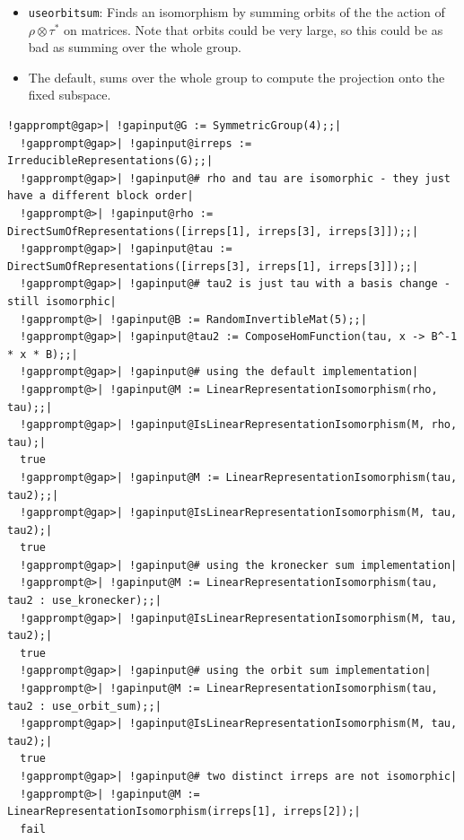 \documentclass[a4paper,11pt]{report}
\begin{document}
{{{ 
\begin{itemize}
\item  \texttt{use{\textunderscore}orbit{\textunderscore}sum}: Finds an isomorphism by summing orbits of the the action of $\rho \otimes \tau^*$ on matrices. Note that orbits could be very large, so this could be as bad as
summing over the whole group. 
\end{itemize}
 

 
\begin{itemize}
\item  The default, sums over the whole group to compute the projection onto the
fixed subspace. 
\end{itemize}
 

 

 
\begin{Verbatim}[commandchars=!@|,fontsize=\small,frame=single,label=Example]
  !gapprompt@gap>| !gapinput@G := SymmetricGroup(4);;|
  !gapprompt@gap>| !gapinput@irreps := IrreducibleRepresentations(G);;|
  !gapprompt@gap>| !gapinput@# rho and tau are isomorphic - they just have a different block order|
  !gapprompt@>| !gapinput@rho := DirectSumOfRepresentations([irreps[1], irreps[3], irreps[3]]);;|
  !gapprompt@gap>| !gapinput@tau := DirectSumOfRepresentations([irreps[3], irreps[1], irreps[3]]);;|
  !gapprompt@gap>| !gapinput@# tau2 is just tau with a basis change - still isomorphic|
  !gapprompt@>| !gapinput@B := RandomInvertibleMat(5);;|
  !gapprompt@gap>| !gapinput@tau2 := ComposeHomFunction(tau, x -> B^-1 * x * B);;|
  !gapprompt@gap>| !gapinput@# using the default implementation|
  !gapprompt@>| !gapinput@M := LinearRepresentationIsomorphism(rho, tau);;|
  !gapprompt@gap>| !gapinput@IsLinearRepresentationIsomorphism(M, rho, tau);|
  true
  !gapprompt@gap>| !gapinput@M := LinearRepresentationIsomorphism(tau, tau2);;|
  !gapprompt@gap>| !gapinput@IsLinearRepresentationIsomorphism(M, tau, tau2);|
  true
  !gapprompt@gap>| !gapinput@# using the kronecker sum implementation|
  !gapprompt@>| !gapinput@M := LinearRepresentationIsomorphism(tau, tau2 : use_kronecker);;|
  !gapprompt@gap>| !gapinput@IsLinearRepresentationIsomorphism(M, tau, tau2);|
  true
  !gapprompt@gap>| !gapinput@# using the orbit sum implementation|
  !gapprompt@>| !gapinput@M := LinearRepresentationIsomorphism(tau, tau2 : use_orbit_sum);;|
  !gapprompt@gap>| !gapinput@IsLinearRepresentationIsomorphism(M, tau, tau2);|
  true
  !gapprompt@gap>| !gapinput@# two distinct irreps are not isomorphic|
  !gapprompt@>| !gapinput@M := LinearRepresentationIsomorphism(irreps[1], irreps[2]);|
  fail
\end{Verbatim}
 

}}}
\end{document}
